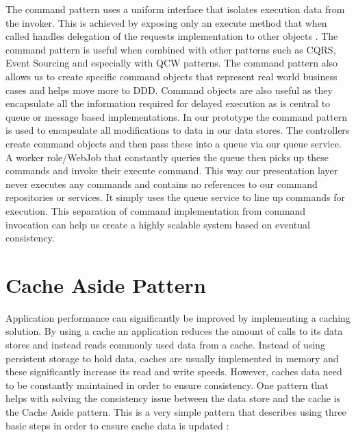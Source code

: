  The command pattern uses a uniform interface that isolates execution data from the invoker. This is achieved by exposing only an execute method that when called handles delegation of the requests implementation to other objects \cite{Gamma1994-ho}. The command pattern is useful when combined with other patterns such as CQRS, Event Sourcing and especially with QCW patterns. The command pattern also allows us to create specific command objects that represent real world business cases and helps move more to DDD. Command objects are also useful as they encapsulate all the information required for delayed execution \cite{Gamma1994-ho} as is central to queue or message based implementations. In our prototype the command pattern is used to encapsulate all modifications to data in our data stores. The controllers create command objects and then pass these into a queue via our queue service. A worker role/WebJob that constantly queries the queue then picks up these commands and invoke their execute command. This way our presentation layer never executes any commands and contains no references to our command repositories or services. It simply uses the queue service to line up commands for execution. This separation of command implementation from command invocation can help us create a highly scalable system based on eventual consistency.
 
 
 \section{Cache Aside Pattern}
 
 Application performance can significantly be improved by implementing a caching solution. By using a cache an application reduces the amount of calls to its data stores and instead reads commonly used data from a cache. Instead of using persistent storage to hold data, caches are usually implemented in memory and these significantly increase its read and write speeds. However, caches data need to be constantly maintained in order to ensure consistency. One pattern that helps with solving the consistency issue between the data store and the cache is the Cache Aside pattern. This is a very simple pattern that describes using three basic steps in order to ensure cache data is updated \cite{Swanson}:
 
